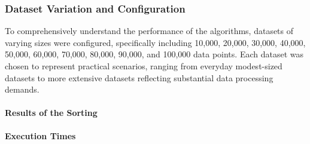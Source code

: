 \documentclass[12pt,twocolumn]{article}
\begin{document}
\subsubsection{Dataset Variation and Configuration}
To comprehensively understand the performance of the algorithms, datasets of varying sizes were configured, specifically including 10,000, 20,000, 30,000, 40,000, 50,000, 60,000, 70,000, 80,000, 90,000, and 100,000 data points. Each dataset was chosen to represent practical scenarios, ranging from everyday modest-sized datasets to more extensive datasets reflecting substantial data processing demands.
\paragraph{Results of the Sorting}
\textbf{Execution Times}
\\
\end{document}
